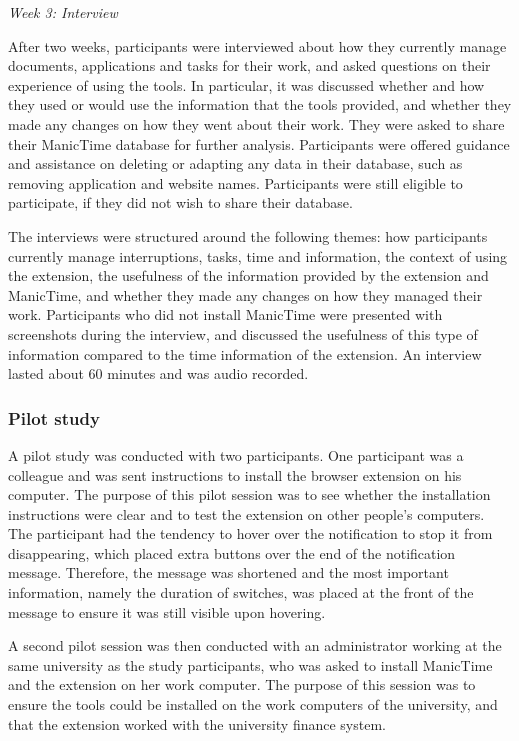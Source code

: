 \textit{Week 3: Interview}

After two weeks, participants were interviewed about how they currently manage documents, applications and tasks for their work, and asked questions on their experience of using the tools. In particular, it was discussed whether and how they used or would use the information that the tools provided, and whether they made any changes on how they went about their work. They were asked to share their ManicTime database for further analysis. Participants were offered guidance and assistance on deleting or adapting any data in their database, such as removing application and website names. Participants were still eligible to participate, if they did not wish to share their database.

The interviews were structured around the following themes: how participants currently manage interruptions, tasks, time and information, the context of using the extension, the usefulness of the information provided by the extension and ManicTime, and whether they made any changes on how they managed their work. Participants who did not install ManicTime were presented with screenshots during the interview, and discussed the usefulness of this type of information compared to the time information of the extension. An interview lasted about 60 minutes and was audio recorded. 

\subsubsection{Pilot study}
A pilot study was conducted with two participants. One participant was a colleague and was sent instructions to install the browser extension on his computer. The purpose of this pilot session was to see whether the installation instructions were clear and to test the extension on other people's computers. The participant had the tendency to hover over the notification to stop it from disappearing, which placed extra buttons over the end of the notification message. Therefore, the message was shortened and the most important information, namely the duration of switches, was placed at the front of the message to ensure it was still visible upon hovering.

A second pilot session was then conducted with an administrator working at the same university as the study participants, who was asked to install ManicTime and the extension on her work computer. The purpose of this session was to ensure the tools could be installed on the work computers of the university, and that the extension worked with the university finance system.

